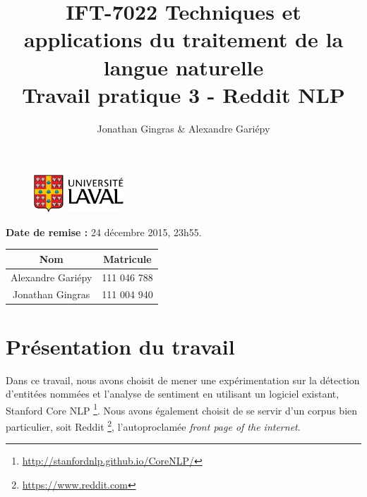 \documentclass[12pt]{article}
\begin{document}
\begin{figure}
  \centering
  \vspace{1cm}
  \includegraphics[width=0.3\textwidth]{fig/u_Laval}
  \vspace{1cm}
\end{figure}
\vspace{2cm}
\title{\Large{IFT-7022 Techniques et applications du traitement de la langue naturelle} \\ Travail pratique 3 - Reddit NLP}
\author{Jonathan Gingras \& Alexandre Gariépy}
\date{}
\maketitle
\vspace{3cm}
\begin{center}
  \textbf{Date de remise :} 24 décembre 2015, 23h55.
\end{center}
\begin{center}
\end{center}
\begin{center}
  \begin{tabular}{|c|c|}              \hline
    Nom               & Matricule   \\\hline
    Alexandre Gariépy & 111 046 788 \\\hline
    Jonathan Gingras  & 111 004 940 \\\hline
  \end{tabular}
\end{center}

\clearpage


\section{Présentation du travail}
Dans ce travail, nous avons choisit de mener une expérimentation sur la détection d'entitées nommées et l'analyse de sentiment en utilisant un logiciel existant, Stanford Core NLP \footnote{\url{http://stanfordnlp.github.io/CoreNLP/}}. Nous avons également choisit de se servir d'un corpus bien particulier, soit Reddit \footnote{\url{https://www.reddit.com}}, l'autoproclamée \textit{front page of the internet}.\\
\end{document}
